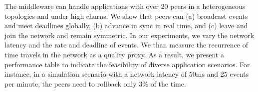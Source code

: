 \documentclass[sn-mathphys,iicol]{sn-jnl}%
\begin{document}
The middleware can handle applications with over 20 peers in a heterogeneous
topologies and under high churns.
%
We show that peers can
    (a) broadcast events and meet deadlines globally, 
    (b) advance in sync in real time, and
    (c) leave and join the network and remain symmetric.
%
In our experiments, we vary the network latency and the rate and deadline of
events.
We than measure the recurrence of time travels in the network as a quality
proxy.
%
As a result, we present a performance table to indicate the feasibility of
diverse application scenarios.
For instance, in a simulation scenario with a network latency of 50ms and 25
events per minute, the peers need to rollback only 3\% of the time.


\end{document}
